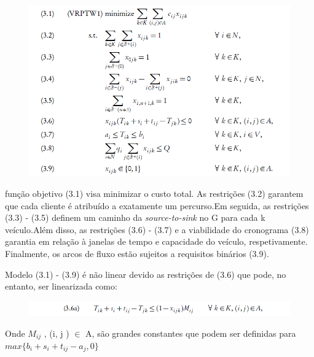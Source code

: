 \begin{figure}[ht!]
\centering
\includegraphics[scale=0.7]{figuras/math1.PNG}
\label{math1}
\end{figure}



função objetivo (3.1) visa minimizar o custo total. As restrições (3.2) garantem que cada cliente é atribuído a exatamente um percurso.Em seguida, as restrições (3.3) - (3.5) definem um caminho da \textit{source-to-sink} no G para cada k veículo.Além disso, as restrições (3.6) - (3.7) e a viabilidade do cronograma (3.8) garantia em relação à janelas de tempo e capacidade do veículo, respetivamente. Finalmente, os arcos de fluxo estão sujeitos a requisitos binários (3.9).

Modelo (3.1) - (3.9) é não linear devido as restrições de (3.6) que pode, no entanto, ser linearizada como: 

\begin{figure}[ht!]
\centering
\includegraphics[scale=0.7]{figuras/math6.PNG}
\label{math6}
\end{figure}

Onde $ M_{ij}$ , (i, j ) $\in$ A, são grandes constantes que podem ser definidas para  $ max \{b_i + s_i +t_{ij} - a_j , 0 \}$



